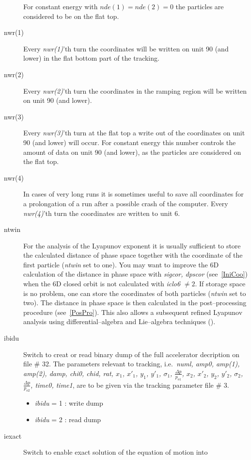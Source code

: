 \begin{description}
  For constant energy with \mbox{$ nde(1) = nde(2) = 0 $} the particles are considered to be on the flat top.
\item [nwr(1)]
  Every {\em nwr(1)}\/'th turn the coordinates will be written on unit 90 (and lower) in the flat bottom part of the tracking.
\item [nwr(2)]
  Every {\em nwr(2)}\/'th turn the coordinates in the ramping region will be written on unit 90 (and lower).
\item [nwr(3)]
  Every {\em nwr(3)}\/'th turn at the flat top a write out of the coordinates on unit 90 (and lower) will occur.
  For
  constant energy this number controls the amount of data on unit 90
  (and lower), as the particles are considered on the flat top.
\item [nwr(4)] In cases of very long runs it is sometimes useful to
  save all coordinates for a prolongation of a run after a possible
  crash of the computer.  Every {\em nwr(4)}\/'th turn the coordinates
  are written to unit 6.
\item [ntwin] For the analysis of the Lyapunov exponent it is usually
  sufficient to store the calculated distance of phase space together
  with the coordinate of the first particle ({\em ntwin} \/set to
  one). You may want to improve the 6D calculation of the distance in
  phase space with {\em sigcor, dpscor} \/(see~\ref{IniCoo}) when the
  6D closed orbit is not calculated with {\em iclo6} \/$\neq 2$. If
  storage space is no problem, one can store the coordinates of both
  particles ({\em ntwin} \/set to two). The distance in phase space is
  then calculated in the post--processing procedure
  (see~\ref{PosPro}). This also allows a subsequent refined Lyapunov
  analysis using differential--algebra and Lie--algebra techniques
  (\cite{Refine}).
\item [ibidu] Switch to creat or read binary dump of the full
  accelerator decription on file \# 32. The parameters relevant to
  tracking, i.e.\ {\em numl, amp0, amp(1), amp(2), damp, chi0, chid,
    rat, $x_1$, $x'_1$, $y_1$, $y'_1$, ${\sigma}_1$, $\frac{\Delta
      p}{p_{o1}}$, $x_2$, $x'_2$, $y_2$, $y'_2$, ${\sigma}_2$,
    $\frac{\Delta p}{p_{o2}}$, time0, time1}, are to be given via the
  tracking parameter file \# 3.
 \begin{itemize}
 \item {\em ibidu} \/= 1 : write dump
 \item {\em ibidu} \/= 2 : read dump
 \end{itemize}
\item [iexact] Switch to enable exact solution of the equation of motion into

\end{description}
